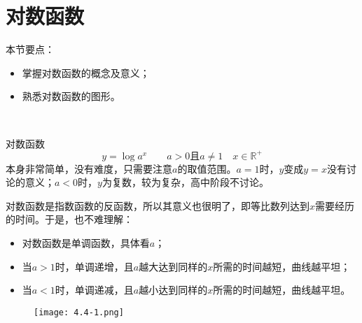 \section{对数函数}

本节要点：
\begin{itemize}
    \item 掌握对数函数的概念及意义；
    \item 熟悉对数函数的图形。
\end{itemize}

~

对数函数
\[
y=\log a^x \qquad a>0\text{且}a\ne 1\quad x\in \mathbb{R} ^+
\]
本身非常简单，没有难度，只需要注意$a$的取值范围。$a=1$时，$y$变成$y=x$没有讨论的意义；$a<0$时，$y$为复数，较为复杂，高中阶段不讨论。

对数函数是指数函数的反函数，所以其意义也很明了，即等比数列达到$x$需要经历的时间。于是，也不难理解：
\begin{itemize}
    \item 对数函数是单调函数，具体看$a$；
    \item 当$a>1$时，单调递增，且$a$越大达到同样的$x$所需的时间越短，曲线越平坦；
    \item 当$a<1$时，单调递减，且$a$越小达到同样的$x$所需的时间越短，曲线越平坦。
\end{itemize}

\begin{figure}[h]
\centering
\texttt{[image: 4.4-1.png]}
\end{figure}




